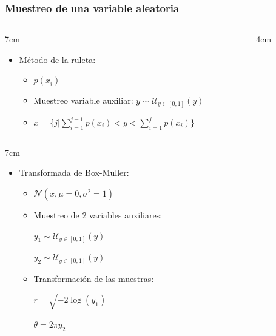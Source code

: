 \documentclass{beamer}
\numberwithin{section}{part}
\begin{document}
\begin{frame}
  \frametitle{Muestreo de una variable aleatoria}  
  \footnotesize  
  
  \begin{columns}[T]
    \begin{column}{7cm}
      \begin{itemize}
        \item \alert{Método de la ruleta:}
        \begin{itemize}
          \footnotesize
          \item $p(x_i)$
          \item Muestreo variable auxiliar:
          $y \sim \mathcal{U}_{y\in [0,1]}(y)$
          \item $x=\{ j |\sum_{i=1}^{j-1}p(x_i) < y<\sum_{i=1}^j p(x_i)\}$
        \end{itemize}
      \end{itemize}
    \end{column}
    \begin{column}{4cm}
      
    \end{column}
  \end{columns}
  
  \vspace{-0.2cm}
  
  \begin{columns}[T]
    \begin{column}{7cm}
      \begin{itemize}
        \item \alert{Transformada de Box-Muller:}
        \begin{itemize}
          \footnotesize
          \item  $\mathcal{N}(x,\mu\!=\!0,\sigma^2\!=\!1)$
          \item Muestreo de 2 variables auxiliares:
          
          \hspace{0.3cm}$y_1 \sim \mathcal{U}_{y\in [0,1]}(y)$
          
          \hspace{0.3cm}$y_2 \sim \mathcal{U}_{y\in [0,1]}(y)$
          \item Transformación de las muestras:
          
          \hspace{0.3cm}$r=\sqrt{-2\log(y_1)}$
          
          \hspace{0.3cm}$\theta=2\pi y_2$
          

\end{itemize}
\end{itemize}
\end{column}
\end{columns}
\end{frame}
\end{document}
